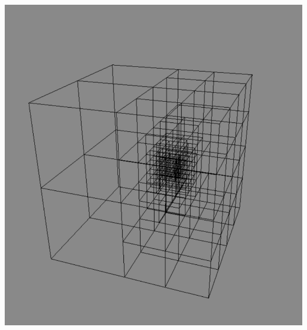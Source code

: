 \documentclass[mathserif, 8pt]{beamer}
\begin{document}
\begin{frame}
    \includegraphics[scale=0.1192]{figures/adapgrid.pdf}
\end{frame}
\end{document}

